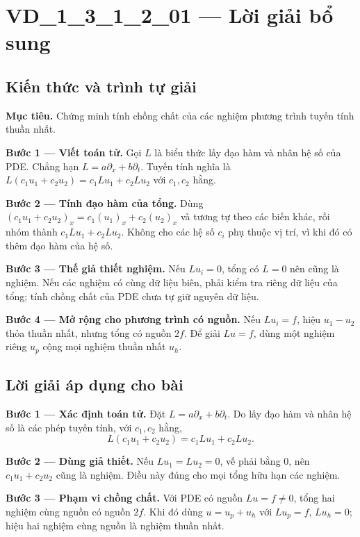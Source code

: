 \documentclass[10pt,a4paper]{article}
\begin{document}
\section*{VD\_1\_3\_1\_2\_01 — Lời giải bổ sung}
\subsection*{Kiến thức và trình tự giải}
\textbf{Mục tiêu.} Chứng minh tính chồng chất của các nghiệm phương trình tuyến tính thuần nhất.

\textbf{Bước 1 — Viết toán tử.} Gọi $L$ là biểu thức lấy đạo hàm và nhân hệ số của PDE. Chẳng hạn $L=a\partial_x+b\partial_t$. Tuyến tính nghĩa là $L(c_1u_1+c_2u_2)=c_1Lu_1+c_2Lu_2$ với $c_1,c_2$ hằng.

\textbf{Bước 2 — Tính đạo hàm của tổng.} Dùng $(c_1u_1+c_2u_2)_x=c_1(u_1)_x+c_2(u_2)_x$ và tương tự theo các biến khác, rồi nhóm thành $c_1Lu_1+c_2Lu_2$. Không cho các hệ số $c_i$ phụ thuộc vị trí, vì khi đó có thêm đạo hàm của hệ số.

\textbf{Bước 3 — Thế giả thiết nghiệm.} Nếu $Lu_i=0$, tổng có $L=0$ nên cũng là nghiệm. Nếu các nghiệm có cùng dữ liệu biên, phải kiểm tra riêng dữ liệu của tổng; tính chồng chất của PDE chưa tự giữ nguyên dữ liệu.

\textbf{Bước 4 — Mở rộng cho phương trình có nguồn.} Nếu $Lu_i=f$, hiệu $u_1-u_2$ thỏa thuần nhất, nhưng tổng có nguồn $2f$. Để giải $Lu=f$, dùng một nghiệm riêng $u_p$ cộng mọi nghiệm thuần nhất $u_h$.
\subsection*{Lời giải áp dụng cho bài}
\textbf{Bước 1 — Xác định toán tử.} Đặt $L=a\partial_x+b\partial_t$. Do lấy đạo hàm và nhân hệ số là các phép tuyến tính, với $c_1,c_2$ hằng,
\[L(c_1u_1+c_2u_2)=c_1Lu_1+c_2Lu_2.\]

\textbf{Bước 2 — Dùng giả thiết.} Nếu $Lu_1=Lu_2=0$, vế phải bằng 0, nên $c_1u_1+c_2u_2$ cũng là nghiệm. Điều này đúng cho mọi tổng hữu hạn các nghiệm.

\textbf{Bước 3 — Phạm vi chồng chất.} Với PDE có nguồn $Lu=f\ne0$, tổng hai nghiệm cùng nguồn có nguồn $2f$. Khi đó dùng $u=u_p+u_h$ với $Lu_p=f$, $Lu_h=0$; hiệu hai nghiệm cùng nguồn là nghiệm thuần nhất.
\end{document}
